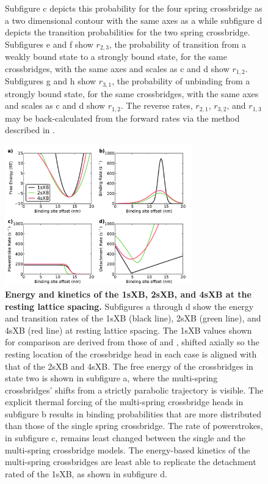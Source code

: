 \documentclass[]{article}
\begin{document}
\begin{figure}[htbp]
\begin{center}
{        Subfigure c depicts this probability for the four spring crossbridge as a two dimensional contour with the same axes as a while subfigure d depicts the transition probabilities for the two spring crossbridge.
        Subfigures e and f show $r_{2,3}$, the probability of transition from a weakly bound state to a strongly bound state, for the same crossbridges, with the same axes and scales as c and d show $r_{1,2}$.
        Subfigures g and h show $r_{3,1}$, the probability of unbinding from a strongly bound state, for the same crossbridges, with the same axes and scales as c and d show $r_{1,2}$.
        The reverse rates, $r_{2,1}$, $r_{3,2}$, and $r_{1,3}$ may be back-calculated from the forward rates via the method described in \cite{Tanner2007}.
    }
    \end{center}
\end{figure}

\begin{figure}[htbp]
    \begin{center}
    \includegraphics[width=3.2in]{../imgs/Figure3.pdf}
    \caption{
        \label{fig_kinetics_cuts}
        \textbf{Energy and kinetics of the 1sXB, 2sXB, and 4sXB at the resting lattice spacing.}
        Subfigures a through d show the energy and transition rates of the 1sXB (black line), 2sXB (green line), and 4sXB (red line) at resting lattice spacing.
        The 1sXB values shown for comparison are derived from those of \citet{Daniel1998} and \citet{Tanner2007}, shifted axially so the resting location of the crossbridge head in each case is aligned with that of the 2sXB and 4sXB. 
        The free energy of the crossbridges in state two is shown in subfigure a, where the multi-spring crossbridges' shifts from a strictly parabolic trajectory is visible.
        The explicit thermal forcing of the multi-spring crossbridge heads in subfigure b results in binding probabilities that are more distributed than those of the single spring crossbridge.
        The rate of powerstrokes, in subfigure c, remains least changed between the single and the multi-spring crossbridge models.
        The energy-based kinetics of the multi-spring crossbridges are least able to replicate the detachment rated of the 1sXB, as shown in subfigure d. 
    }
    \end{center}
\end{figure}
\end{document}
